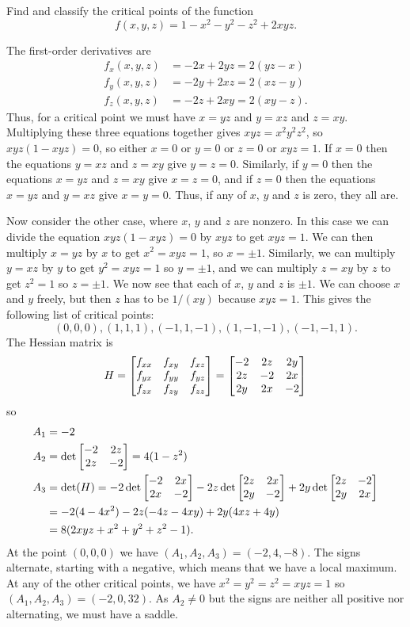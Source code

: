 \documentclass[a4paper]{amsart}
\renewenvironment{solution}{\SolutionInline}{\endSolutionInline}
\begin{document}
\begin{exercise}
 Find and classify the critical points of the function 
 \[ f(x,y,z) = 1 - x^2 - y^2 - z^2 + 2xyz. \]
\end{exercise}
\begin{solution}
 The first-order derivatives are
 \begin{align*}
  f_x(x,y,z) &= -2x+2yz = 2(yz-x) \\
  f_y(x,y,z) &= -2y+2xz = 2(xz-y) \\
  f_z(x,y,z) &= -2z+2xy = 2(xy-z).
 \end{align*}
 Thus, for a critical point we must have $x=yz$ and $y=xz$ and
 $z=xy$.  Multiplying these three equations together gives
 $xyz=x^2y^2z^2$, so $xyz(1-xyz)=0$, so either $x=0$ or $y=0$ or $z=0$
 or $xyz=1$.  If $x=0$ then the equations $y=xz$ and $z=xy$ give
 $y=z=0$.  Similarly, if $y=0$ then the equations $x=yz$ and $z=xy$
 give $x=z=0$, and if $z=0$ then the equations $x=yz$ and $y=xz$ give
 $x=y=0$.  Thus, if any of $x$, $y$ and $z$ is zero, they all are.

 Now consider the other case, where $x$, $y$ and $z$ are nonzero.  In
 this case we can divide the equation $xyz(1-xyz)=0$ by $xyz$ to get
 $xyz=1$.  We can then multiply $x=yz$ by $x$ to get $x^2=xyz=1$, so
 $x=\pm 1$.  Similarly, we can multiply $y=xz$ by $y$ to get
 $y^2=xyz=1$ so $y=\pm 1$, and we can multiply $z=xy$ by $z$ to get
 $z^2=1$ so $z=\pm 1$.  We now see that each of $x$, $y$ and $z$ is
 $\pm 1$.  We can choose $x$ and $y$ freely, but then $z$ has to be
 $1/(xy)$ because $xyz=1$.  This gives the following list of critical
 points: 
 \[ (0,0,0),(1,1,1),(-1,1,-1),(1,-1,-1),(-1,-1,1). \]
 The Hessian matrix is
 \[ H = \left[\begin{matrix} f_{xx} & f_{xy} & f_{xz} \\
             f_{yx} & f_{yy} & f_{yz} \\
             f_{zx} & f_{zy} & f_{zz} \end{matrix}\right] 
      = \left[\begin{matrix} -2 & 2z & 2y \\
             2z & -2 & 2x \\
             2y & 2x & -2 \end{matrix}\right]
 \]
 so 
 \begin{align*}
  A_1 &= -2 \\
  A_2 &= \det\left[\begin{matrix} -2 & 2z \\ 2z & -2 \end{matrix}\right] = 4(1-z^2) \\
  A_3 &= \det(H) = 
          -2 \det\left[\begin{matrix} -2 & 2x \\ 2x & -2 \end{matrix}\right]
          -2z\det\left[\begin{matrix} 2z & 2x \\ 2y & -2 \end{matrix}\right] 
          +2y\det\left[\begin{matrix} 2z & -2 \\ 2y & 2x \end{matrix}\right] \\
      &= -2(4-4x^2)-2z(-4z-4xy)+2y(4xz+4y) \\
      &= 8(2xyz+x^2+y^2+z^2-1).
 \end{align*}
 At the point $(0,0,0)$ we have $(A_1,A_2,A_3)=(-2,4,-8)$.  The signs
 alternate, starting with a negative, which means that we have a local
 maximum.  At any of the other critical points, we have
 $x^2=y^2=z^2=xyz=1$ so $(A_1,A_2,A_3)=(-2,0,32)$.  As $A_2\neq 0$ but
 the signs are neither all positive nor alternating, we must have a
 saddle. 
\end{solution}
\end{document}
